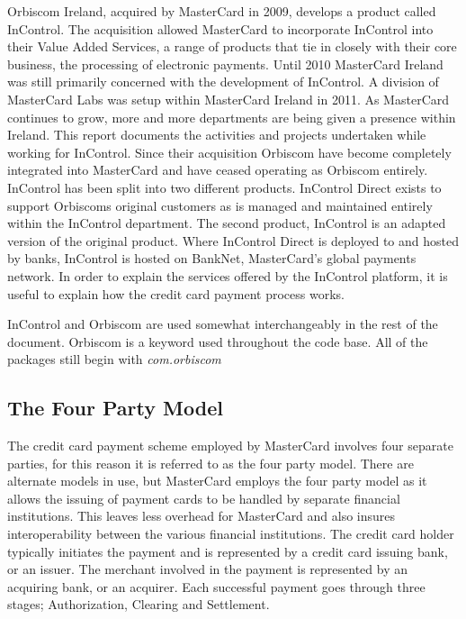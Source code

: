 \documentclass[a4paper, 11pt, titlepage]{article}
\begin{document}
Orbiscom Ireland, acquired by MasterCard in 2009, develops a product called InControl. The acquisition allowed MasterCard to incorporate InControl into their Value Added Services, a range of products that tie in closely with their core business, the processing of electronic payments. Until 2010 MasterCard Ireland was still primarily concerned with the development of InControl. A division of MasterCard Labs was setup within MasterCard Ireland in 2011. As MasterCard continues to grow, more and more departments are being given a presence within Ireland. This report documents the activities and projects undertaken while working for InControl. Since their acquisition Orbiscom have become completely integrated into MasterCard and have ceased operating as Orbiscom entirely. InControl has been split into two different products. InControl Direct exists to support Orbiscoms original customers as is managed and maintained entirely within the InControl department. The second product, InControl is an adapted version of the original product. Where InControl Direct is deployed to and hosted by banks, InControl is hosted on BankNet, MasterCard’s global payments network. In order to explain the services offered by the InControl platform, it is useful to explain how the credit card payment process works. 
 
InControl and Orbiscom are used somewhat interchangeably in the rest of the document. Orbiscom is a keyword used throughout the code base. All of the packages still begin with \textit{com.orbiscom} 
 
\subsection{The Four Party Model} 
The credit card payment scheme employed by MasterCard involves four separate parties, for this reason it is referred to as the four party model. There are alternate models in use, but MasterCard employs the four party model as it allows the issuing of payment cards to be handled by separate financial institutions. This leaves less overhead for MasterCard and also insures interoperability between the various financial institutions. The credit card holder typically initiates the payment and is represented by a credit card issuing bank, or an issuer. The merchant involved in the payment is represented by an acquiring bank, or an acquirer. Each successful payment goes through three stages; Authorization, Clearing and Settlement. 
\end{document}
